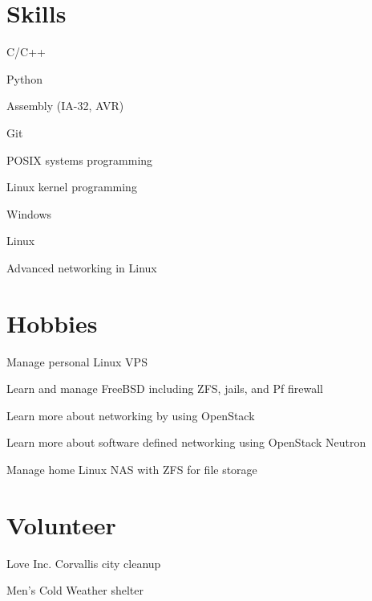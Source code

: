 \documentclass[margin,line]{resume}
\begin{document}
\begin{resume}
    \section{\mysidestyle Skills}
    \begin{list2}
    \item C/C++
    \item Python
    \item Assembly (IA-32, AVR)
    \item Git
    \item POSIX systems programming
    \item Linux kernel programming
    \item Windows
    \item Linux
    \item Advanced networking in Linux\\
    \end{list2}\vspace{-1.5mm}

    \section{\mysidestyle Hobbies}
    \begin{list2}
    \item Manage personal Linux VPS
    \item Learn and manage FreeBSD including ZFS, jails, and Pf firewall
    \item Learn more about networking by using OpenStack
    \item Learn more about software defined networking using OpenStack Neutron
    \item Manage home Linux NAS with ZFS for file storage\\
    \end{list2}\vspace{-1.5mm}


    \section{\mysidestyle Volunteer}
    \begin{list2}
    \item Love Inc. Corvallis city cleanup
    \item Men's Cold Weather shelter
    \end{list2}\vspace{-1.5mm}


\end{resume}
\end{document}
